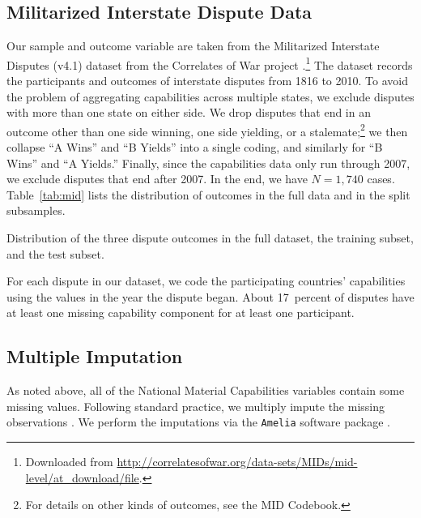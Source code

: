 \subsection{Militarized Interstate Dispute Data}

Our sample and outcome variable are taken from the Militarized Interstate Disputes (v4.1) dataset from the Correlates of War project \citep{Palmer:2015hp}.\footnote{
  Downloaded from \url{http://correlatesofwar.org/data-sets/MIDs/mid-level/at_download/file}.
}
The dataset records the participants and outcomes of interstate disputes from 1816 to 2010.
To avoid the problem of aggregating capabilities across multiple states, we exclude disputes with more than one state on either side.
We drop disputes that end in an outcome other than one side winning, one side yielding, or a stalemate;\footnote{
  For details on other kinds of outcomes, see the MID Codebook.
}
we then collapse ``A Wins'' and ``B Yields'' into a single coding, and similarly for ``B Wins'' and ``A Yields.''
Finally, since the capabilities data only run through 2007, we exclude disputes that end after 2007.
In the end, we have $N = 1{,}740$ cases.
Table~\ref{tab:mid} lists the distribution of outcomes in the full data and in the split subsamples.

\begin{table}[htp]
  \centering
  
  \caption{
    Distribution of the three dispute outcomes in the full dataset, the training subset, and the test subset.
  }
  \label{tab:mid}
\end{table}

For each dispute in our dataset, we code the participating countries' capabilities using the values in the year the dispute began.
About 17~percent of disputes have at least one missing capability component for at least one participant.

\subsection{Multiple Imputation}

As noted above, all of the National Material Capabilities variables contain some missing values.
Following standard practice, we multiply impute the missing observations \citep{honaker_what_2010}.
We perform the imputations via the \texttt{Amelia} software package \citep{pkg-Amelia}.

